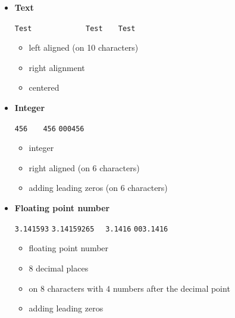 \documentclass[11pt,class=report,crop=false]{standalone}
\begin{document}
\begin{itemize}
  \item \textbf{Text}
  
  \begin{center}
 \lstinline[showspaces=true]!Test      ! \qquad\qquad
    \lstinline[showspaces=true]!      Test!  \qquad\qquad
 \lstinline[showspaces=true]!   Test   !   
 \end{center}
 
  \begin{itemize}
    \item {} \quad left aligned (on 10 characters)
    \item {} \quad right alignment
    \item {} \quad centered 
  \end{itemize}

  \item \textbf{Integer}
  
  \begin{center}
 \lstinline[showspaces=true]!456! \qquad\qquad
    \lstinline[showspaces=true]!   456!  \qquad\qquad
 \lstinline[showspaces=true]!000456!   
 \end{center}
 
  \begin{itemize}
    \item {} \quad integer  
    \item {} \quad right aligned (on 6 characters)
    \item {} \quad adding leading zeros (on 6 characters)
  \end{itemize} 
  
  \item \textbf{Floating point number}
  
  \begin{center}
 \lstinline[showspaces=true]!3.141593! \qquad\qquad
    \lstinline[showspaces=true]!3.14159265!  \qquad\qquad
 \lstinline[showspaces=true]!  3.1416!  \qquad\qquad
 \lstinline[showspaces=true]!003.1416!   
 \end{center}
 
  \begin{itemize}
    \item {} \quad floating point number 
    \item {} \quad $8$ decimal places 
    \item {} \quad on $8$ characters with $4$ numbers after the decimal point 
    \item 
     \quad adding leading zeros 
  \end{itemize}   
   
\end{itemize}
\end{document}
